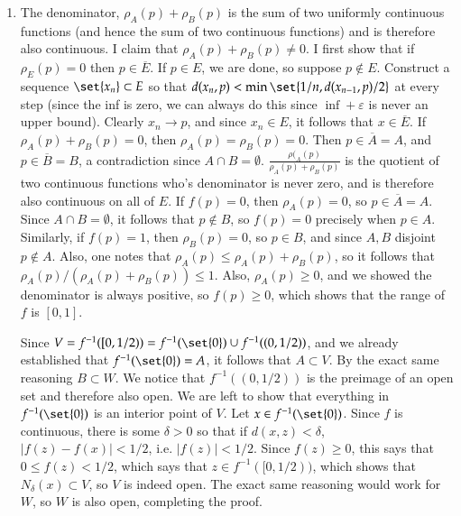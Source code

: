 \documentclass[12pt]{article}
\def \ve{\varepsilon}
\theoremstyle{definition}
\theoremstyle{remark}
\begin{document}
\begin{enumerate}[leftmargin=\labelsep]
		\item The denominator, $\rho_A(p) + \rho_B(p)$ is the sum of two uniformly continuous functions (and hence the sum of two continuous functions) and is therefore also continuous. I claim that $\rho_A(p) + \rho_B(p) \neq 0$. I first show that if $\rho_E(p) = 0$ then $p \in \overline{E}$. If $p \in E$, we are done, so suppose $p \not \in E$. Construct a sequence $\set{x_n} \subset E$ so that $d(x_n, p) < \min\set{1/n, d(x_{n-1}, p)/2}$ at every step (since the inf is zero, we can always do this since $\inf + \ve$ is never an upper bound). Clearly $x_n \to p$, and since $x_n \in E$, it follows that $x \in \overline{E}$. If $\rho_A(p) + \rho_B(p) = 0$, then $\rho_A(p) = \rho_B(p) = 0$. Then $p \in \overline{A} = A$, and $p \in \overline{B} = B$, a contradiction since $A \cap B = \emptyset$. $\frac{\rho(_A(p)}{\rho_A(p)+\rho_B(p)}$ is the quotient of two continuous functions who's denominator is never zero, and is therefore also continuous on all of $E$. If $f(p) = 0$, then $\rho_A(p) = 0$, so $p \in \overline{A} = A$. Since $A \cap B = \emptyset$, it follows that $p \not \in B$, so $f(p) = 0$ precisely when $p \in A$. Similarly, if $f(p) = 1$, then $\rho_B(p) = 0$, so $p \in B$, and since $A, B$ disjoint $p \not \in A$. Also, one notes that $\rho_A(p) \leq \rho_A(p) + \rho_B(p)$, so it follows that $\rho_A(p)/(\rho_A(p) + \rho_B(p)) \leq 1$. Also, $\rho_A(p) \geq 0$, and we showed the denominator is always positive, so $f(p) \geq 0$, which shows that the range of $f$ is $[0, 1]$.
		
		Since $V = f^{-1}([0, 1/2)) = f^{-1}(\set{0}) \cup f^{-1}((0, 1/2))$, and we already established that $f^{-1}(\set{0}) = A$, it follows that $A \subset V$. By the exact same reasoning $B \subset W$. We notice that $f^{-1}((0, 1/2))$ is the preimage of an open set and therefore also open. We are left to show that everything in $f^{-1}(\set{0})$ is an interior point of $V$. Let $x \in f^{-1}(\set{0})$. Since $f$ is continuous, there is some $\delta > 0$ so that if $d(x, z) < \delta$, $|f(z) - f(x)| < 1/2$, i.e. $|f(z)| < 1/2$. Since $f(z) \geq 0$, this says that $0 \leq f(z) < 1/2$, which says that $z \in f^{-1}([0, 1/2))$, which shows that $N_\delta(x) \subset V$, so $V$ is indeed open. The exact same reasoning would work for $W$, so $W$ is also open, completing the proof.
		\end{enumerate}
\end{document}
